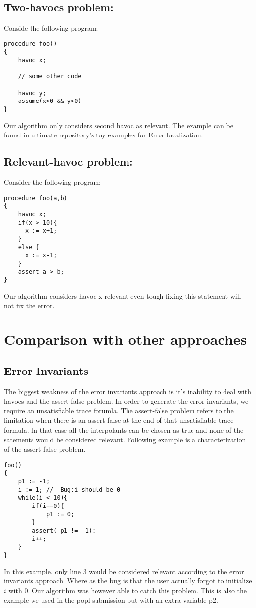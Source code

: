 \documentclass{article}
\begin{document}
\subsection{Two-havocs problem:}
Conside the following program:
\begin{lstlisting}
procedure foo()
{
	havoc x;
	
	// some other code	
	
	havoc y;
	assume(x>0 && y>0)
}
\end{lstlisting}
Our algorithm only considers second havoc as relevant. The example can be found in ultimate repository's toy examples for Error localization.

\subsection{Relevant-havoc problem:}
Consider the following program:
\begin{lstlisting}
procedure foo(a,b)
{
    havoc x;
    if(x > 10){
      x := x+1;
    }
    else {
      x := x-1;
    }
    assert a > b;
}
\end{lstlisting}
Our algorithm considers havoc x relevant even tough fixing this statement will not fix the error.

\section{Comparison with other approaches}
\subsection{Error Invariants}
The biggest weakness of the error invariants approach \cite{errorinvariants} is it's inability to deal with havocs and the assert-false problem. In order to generate the error invariants, we require an unsatisfiable trace forumla.  The assert-false problem refers to the limitation when there is an assert false at the end of that unsatisfiable trace formula. In that case all the interpolants can be chosen as true and none of the satements would be considered relevant. Following example is a characterization of the assert false problem.
\begin{lstlisting}
foo()
{ 
	p1 := -1;
	i := 1; //  Bug:i should be 0
	while(i < 10){
		if(i==0){
			p1 := 0;		
		}
		assert( p1 != -1):
		i++;	
	}
}
\end{lstlisting}
In this example, only line 3 would be considered relevant according to the error invariants approach. Where as the bug is that the user actually forgot to initialize $i$ with 0. Our algorithm was however able to catch this problem. This is also the example we used in the popl submission but with an extra variable p2.
\end{document}
